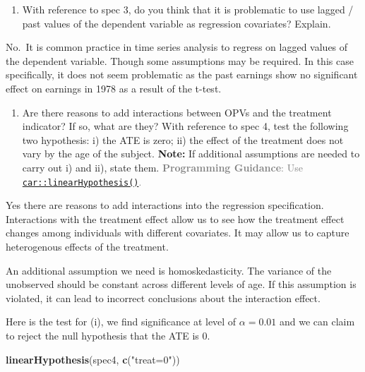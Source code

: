 \documentclass[
]{article}
\newenvironment{Shaded}{\begin{snugshade}}{\end{snugshade}}
\newcommand{\FunctionTok}[1]{\textcolor[rgb]{0.13,0.29,0.53}{\textbf{#1}}}
\newcommand{\NormalTok}[1]{#1}
\newcommand{\StringTok}[1]{\textcolor[rgb]{0.31,0.60,0.02}{#1}}
\providecommand{\tightlist}{%
  \setlength{\itemsep}{0pt}\setlength{\parskip}{0pt}}
\begin{document}
\begin{enumerate}
\def\labelenumi{\alph{enumi}.}
\setcounter{enumi}{2}
\tightlist
\item
  With reference to spec 3, do you think that it is problematic to use
  lagged / past values of the dependent variable as regression
  covariates? Explain.
\end{enumerate}

No.~It is common practice in time series analysis to regress on lagged
values of the dependent variable. Though some assumptions may be
required. In this case specifically, it does not seem problematic as the
past earnings show no significant effect on earnings in 1978 as a result
of the t-test.

\begin{enumerate}
\def\labelenumi{\alph{enumi}.}
\setcounter{enumi}{3}
\tightlist
\item
  Are there reasons to add interactions between OPVs and the treatment
  indicator? If so, what are they? With reference to spec 4, test the
  following two hypothesis: i) the ATE is zero; ii) the effect of the
  treatment does not vary by the age of the subject. \textbf{Note:} If
  additional assumptions are needed to carry out i) and ii), state them.
  \textcolor{gray}{\textbf{Programming Guidance}: Use \href{https://rdrr.io/cran/car/man/linearHypothesis.html}{\texttt{car::linearHypothesis()}}.}
\end{enumerate}

Yes there are reasons to add interactions into the regression
specification. Interactions with the treatment effect allow us to see
how the treatment effect changes among individuals with different
covariates. It may allow us to capture heterogenous effects of the
treatment.

An additional assumption we need is homoskedasticity. The variance of
the unobserved should be constant across different levels of age. If
this assumption is violated, it can lead to incorrect conclusions about
the interaction effect.

Here is the test for (i), we find significance at level of
\(\alpha = 0.01\) and we can claim to reject the null hypothesis that
the ATE is 0.

\begin{Shaded}
\begin{Highlighting}[]
\FunctionTok{linearHypothesis}\NormalTok{(spec4, }\FunctionTok{c}\NormalTok{(}\StringTok{"treat=0"}\NormalTok{))}
\end{Highlighting}
\end{Shaded}
\end{document}
